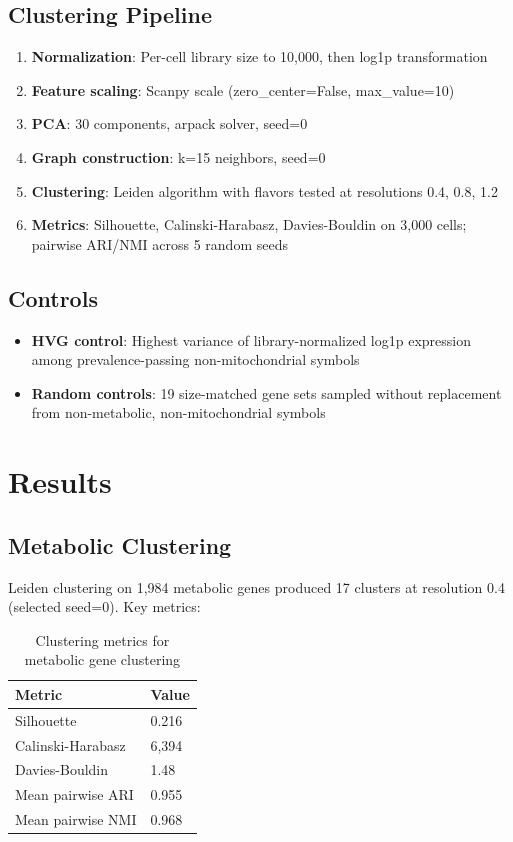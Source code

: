 \documentclass[11pt,a4paper]{article}
\begin{document}
\subsection{Clustering Pipeline}
\begin{enumerate}
    \item \textbf{Normalization}: Per-cell library size to 10,000, then log1p transformation
    \item \textbf{Feature scaling}: Scanpy scale (zero_center=False, max_value=10)
    \item \textbf{PCA}: 30 components, arpack solver, seed=0
    \item \textbf{Graph construction}: k=15 neighbors, seed=0
    \item \textbf{Clustering}: Leiden algorithm with flavors tested at resolutions 0.4, 0.8, 1.2
    \item \textbf{Metrics}: Silhouette, Calinski-Harabasz, Davies-Bouldin on 3,000 cells; pairwise ARI/NMI across 5 random seeds
\end{enumerate}

\subsection{Controls}
\begin{itemize}
    \item \textbf{HVG control}: Highest variance of library-normalized log1p expression among prevalence-passing non-mitochondrial symbols
    \item \textbf{Random controls}: 19 size-matched gene sets sampled without replacement from non-metabolic, non-mitochondrial symbols
\end{itemize}

\section{Results}

\subsection{Metabolic Clustering}
Leiden clustering on 1,984 metabolic genes produced 17 clusters at resolution 0.4 (selected seed=0). Key metrics:
\begin{table}[h]
\centering
\caption{Clustering metrics for metabolic gene clustering}
\begin{tabular}{ll}
\toprule
Metric & Value \\
\midrule
Silhouette & 0.216 \\
Calinski-Harabasz & 6,394 \\
Davies-Bouldin & 1.48 \\
Mean pairwise ARI & 0.955 \\
Mean pairwise NMI & 0.968 \\
\bottomrule
\end{tabular}
\end{table}
\end{document}
